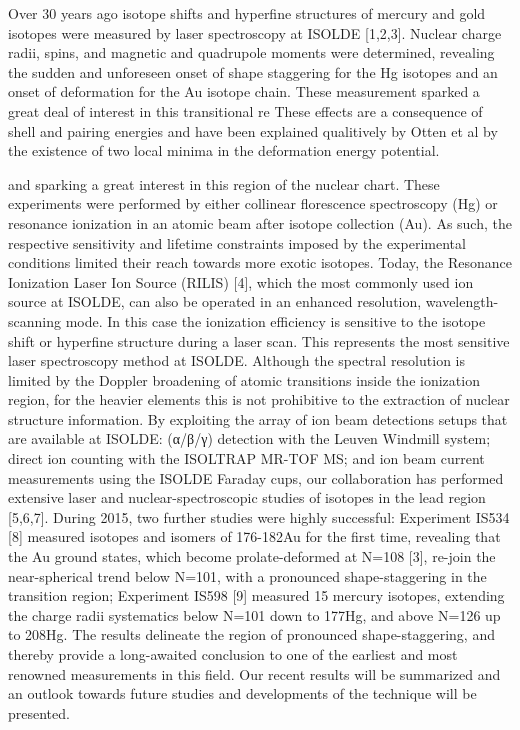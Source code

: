 Over 30 years ago isotope shifts and hyperfine structures of mercury and gold isotopes were measured by laser spectroscopy at ISOLDE [1,2,3]. Nuclear charge radii, spins, and magnetic and quadrupole moments were determined, revealing the sudden and unforeseen onset of shape staggering for the Hg isotopes and an onset of deformation for the Au isotope chain.  These measurement sparked a great deal of interest in this transitional re
These effects are a consequence of shell and pairing energies and have been explained qualitively by Otten et al by the existence of two local minima in the deformation energy potential.




and sparking a great interest in this region of the nuclear chart.  These experiments were performed by either collinear florescence spectroscopy (Hg) or resonance ionization in an atomic beam after isotope collection (Au).  As such, the respective sensitivity and lifetime constraints imposed by the experimental conditions limited their reach towards more exotic isotopes.  Today, the Resonance Ionization Laser Ion Source (RILIS) [4], which the most commonly used ion source at ISOLDE, can also be operated in an enhanced resolution, wavelength-scanning mode. In this case the ionization efficiency is sensitive to the isotope shift or hyperfine structure during a laser scan.  This represents the most sensitive laser spectroscopy method at ISOLDE. Although the spectral resolution is limited by the Doppler broadening of atomic transitions inside the ionization region, for the heavier elements this is not prohibitive to the extraction of nuclear structure information.  By exploiting the array of ion beam detections setups that are available at ISOLDE: (α/β/γ) detection with the Leuven Windmill system; direct ion counting with the ISOLTRAP MR-TOF MS; and ion beam current measurements using the ISOLDE Faraday cups, our collaboration has performed extensive laser and nuclear-spectroscopic studies of isotopes in the lead region [5,6,7].  During 2015, two further studies were highly successful: Experiment IS534 [8] measured isotopes and isomers of 176-182Au for the first time, revealing that the Au ground states, which become prolate-deformed at N=108 [3], re-join the near-spherical trend below N=101, with a pronounced shape-staggering in the transition region; Experiment IS598 [9] measured 15 mercury isotopes, extending the charge radii systematics below N=101 down to 177Hg, and above N=126 up to 208Hg.  The results delineate the region of pronounced shape-staggering, and thereby provide a long-awaited conclusion to one of the earliest and most renowned measurements in this field.   Our recent results will be summarized and an outlook towards future studies and developments of the technique will be presented.